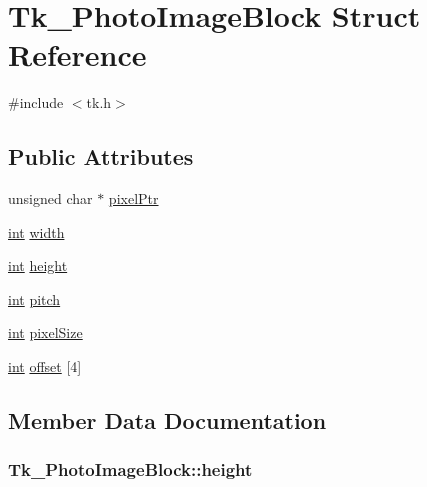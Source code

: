 \hypertarget{struct_tk___photo_image_block}{}\section{Tk\+\_\+\+Photo\+Image\+Block Struct Reference}
\label{struct_tk___photo_image_block}


{\ttfamily \#include $<$tk.\+h$>$}

\subsection*{Public Attributes}
\begin{DoxyCompactItemize}
\item 
unsigned char $\ast$ \hyperlink{struct_tk___photo_image_block_a64241caa85c0dea5bef3ab2e7f603549}{pixel\+Ptr}
\item 
\hyperlink{tk_8h_a83f82f76e7fed06f4c49d2db94028a6d}{int} \hyperlink{struct_tk___photo_image_block_a3f607860560e4fc21497c49545531ac9}{width}
\item 
\hyperlink{tk_8h_a83f82f76e7fed06f4c49d2db94028a6d}{int} \hyperlink{struct_tk___photo_image_block_a33509d99d582daf950993ea7f1454a36}{height}
\item 
\hyperlink{tk_8h_a83f82f76e7fed06f4c49d2db94028a6d}{int} \hyperlink{struct_tk___photo_image_block_a7eb396ad73318a19e4c3ac0b12bc37e5}{pitch}
\item 
\hyperlink{tk_8h_a83f82f76e7fed06f4c49d2db94028a6d}{int} \hyperlink{struct_tk___photo_image_block_a5f220a949e02d5b64dafda4f49d57d9b}{pixel\+Size}
\item 
\hyperlink{tk_8h_a83f82f76e7fed06f4c49d2db94028a6d}{int} \hyperlink{struct_tk___photo_image_block_a41761f33de576b138426aba79525f107}{offset} \mbox{[}4\mbox{]}
\end{DoxyCompactItemize}


\subsection{Member Data Documentation}
\subsubsection[{\texorpdfstring{height}{height}}]{ Tk\+\_\+\+Photo\+Image\+Block\+::height}\hypertarget{struct_tk___photo_image_block_a33509d99d582daf950993ea7f1454a36}{}\label{struct_tk___photo_image_block_a33509d99d582daf950993ea7f1454a36}
